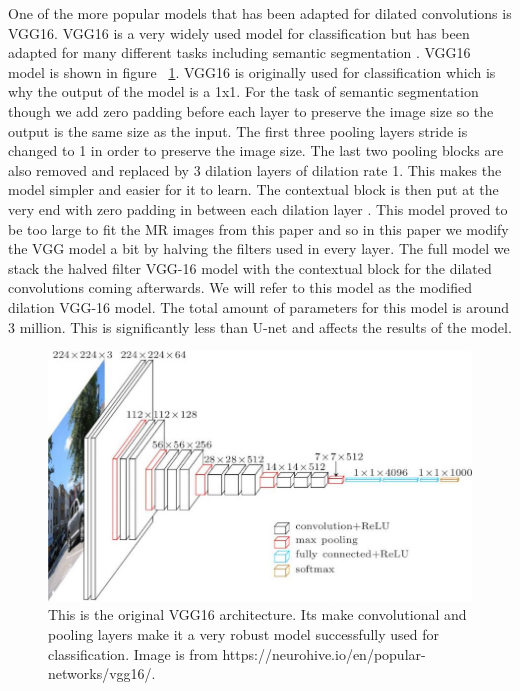 One of the more popular models that has been adapted for dilated convolutions is VGG16. 
 VGG16 is a very widely used model for classification but has been adapted for many different tasks including semantic segmentation \cite{Simonyan15}. 
 VGG16 model is shown in figure ~\ref{fig_vgg16}. 
 VGG16 is originally used for classification which is why the output of the model is a 1x1. 
 For the task of semantic segmentation though we add zero padding before each layer to preserve the image size so the output is the same size as the input. 
 The first three pooling layers stride is changed to 1 in order to preserve the image size. 
 The last two pooling blocks are also removed and replaced by 3 dilation layers of dilation rate 1. 
 This makes the model simpler and easier for it to learn. 
 The contextual block is then put at the very end with zero padding in between each dilation layer \cite{Yu2016MultiScaleCA}. 
 This model proved to be too large to fit the MR images from this paper and so in this paper we modify the VGG model a bit by halving the filters used in every layer. 
 The full model we stack the halved filter VGG-16 model with the contextual block for the dilated convolutions coming afterwards. 
 We will refer to this model as the modified dilation VGG-16 model. 
 The total amount of parameters for this model is around 3 million. 
 This is significantly less than U-net and affects the results of the model. 
 
 \begin{figure}[tbh]
\centering
\includegraphics[width=\textwidth]{vgg16-neural-network.jpg}
\caption{ This is the original VGG16 architecture. Its make convolutional and pooling layers make it a very robust model successfully used for classification. Image is from https://neurohive.io/en/popular-networks/vgg16/.}
\label{fig_vgg16}
\end{figure}
 
